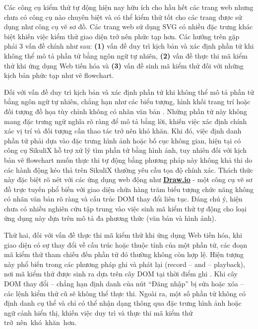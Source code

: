 \documentclass[a4paper, 12pt]{report}
\begin{document}
Các công cụ kiểm thử tự động hiện nay hữu ích cho hầu hết các trang web nhưng chưa có công cụ nào chuyên biệt và có thể kiểm thử tốt cho các trang được sử dụng như công cụ vẽ sơ đồ. Các trang web sử dụng SVG có nhiều đặc trưng khác biệt khiến việc kiểm thử giao diện trở nên phức tạp hơn. Các hướng trên gặp phải 3 vấn đề chính như sau: \textbf{(1)} vấn đề duy trì kịch bản và xác định phần tử khi không thể mô tả phần tử bằng ngôn ngữ tự nhiên,  \textbf{(2)} vấn đề thực thi mã kiểm thử khi ứng dụng Web tiến hóa và \textbf{(3)} vấn đề sinh mã kiểm thử đối với những kịch bản phức tạp như vẽ flowchart. 


Đối với vấn đề duy trì kịch bản và xác định phần tử khi không thể mô tả phần tử bằng ngôn ngữ tự nhiên, chẳng hạn như các biểu tượng, hình khối trang trí hoặc đối tượng đồ họa tùy chỉnh không có nhãn văn bản \cite{10.1145/1622176.1622213}. Những phần tử này không mang đặc trưng ngữ nghĩa rõ ràng để mô tả bằng lời, khiến việc xác định chính xác vị trí và đối tượng cần thao tác trở nên khó khăn. Khi đó, việc định danh phần tử phải dựa vào đặc trưng hình ảnh hoặc bố cục không gian, hiện tại có công cụ SikuliX hỗ trợ xử lý tìm phần tử bằng hình ảnh, tuy nhiên đối với kịch bản vẽ flowchart muốn thực thi tự động bằng phương pháp này không khả thi do các hành động kéo thả trên SikuliX thường yêu cầu tọa độ chính xác. Thách thức này đặc biệt rõ nét với các ứng dụng web động như \href{https://app.diagrams.net/}{\textbf{Draw.io}} \cite{drawio} - một công cụ vẽ sơ đồ trực tuyến phổ biến với giao diện chứa hàng trăm biểu tượng chức năng không có nhãn văn bản rõ ràng và cấu trúc DOM thay đổi liên tục. Đáng chú ý, hiện chưa có nhiều nghiên cứu tập trung vào việc sinh mã kiểm thử tự động cho loại ứng dụng này dựa trên mô tả đa phương thức (văn bản và hình ảnh).


Thứ hai, đối với vấn đề thực thi mã kiểm thử khi ứng dụng Web tiến hóa, khi giao diện có sự thay đổi về cấu trúc hoặc thuộc tính của một phần tử, các đoạn mã kiểm thử tham chiếu đến phần tử đó thường không còn hợp lệ. Hiện tượng này phổ biến trong các phương pháp ghi và phát lại (record -- and -- playback), nơi mã kiểm thử được sinh ra dựa trên cây DOM tại thời điểm ghi \cite{DELUCA2024111932}. Khi cây DOM thay đổi -- chẳng hạn định danh của nút “Đăng nhập” bị sửa hoặc xóa -- các lệnh kiểm thử cũ sẽ không thể thực thi. Ngoài ra, một số phần tử không có định danh cụ thể và chỉ có thể nhận dạng thông qua đặc trưng hình ảnh hoặc ngữ cảnh hiển thị, khiến việc duy trì và thực thi mã kiểm thử trở~nên~khó~khăn~hơn.
\end{document}
